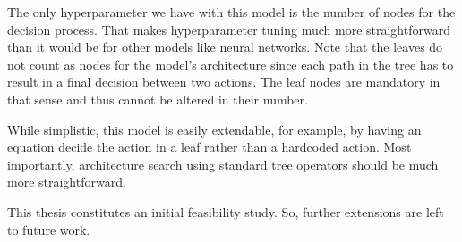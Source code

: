 The only hyperparameter we have with this model is the number of nodes for the decision process. That makes hyperparameter tuning much more straightforward than it would be for other models like neural networks. Note that the leaves do not count as nodes for the model's architecture since each path in the tree has to result in a final decision between two actions. The leaf nodes are mandatory in that sense and thus cannot be altered in their number.

While simplistic, this model is easily extendable, for example, by having an equation decide the action in a leaf rather than a hardcoded action. Most importantly, architecture search using standard tree operators should be much more straightforward.

This thesis constitutes an initial feasibility study. So, further extensions are left to future work.

